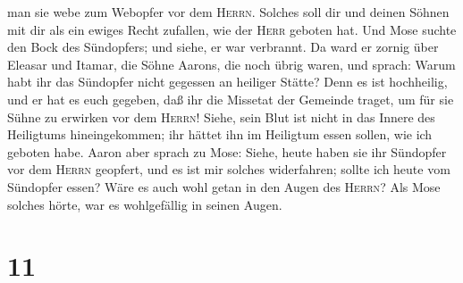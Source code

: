man sie webe zum Webopfer vor dem \textsc{Herrn}. Solches soll dir und
deinen Söhnen mit dir als ein ewiges Recht zufallen, wie der
\textsc{Herr} geboten hat.  Und Mose suchte den Bock des
Sündopfers; und siehe, er war verbrannt. Da ward er zornig über Eleasar
und Itamar, die Söhne Aarons, die noch übrig waren, und sprach:
 Warum habt ihr das Sündopfer nicht gegessen an heiliger
Stätte? Denn es ist hochheilig, und er hat es euch gegeben, daß ihr die
Missetat der Gemeinde traget, um für sie Sühne zu erwirken vor dem
\textsc{Herrn}!  Siehe, sein Blut ist nicht in das Innere
des Heiligtums hineingekommen; ihr hättet ihn im Heiligtum essen sollen,
wie ich geboten habe.  Aaron aber sprach zu Mose: Siehe,
heute haben sie ihr Sündopfer vor dem \textsc{Herrn} geopfert, und es
ist mir solches widerfahren; sollte ich heute vom Sündopfer essen? Wäre
es auch wohl getan in den Augen des \textsc{Herrn}?  Als
Mose solches hörte, war es wohlgefällig in seinen Augen.

\hypertarget{section-10}{%
\section{11}\label{section-10}}


